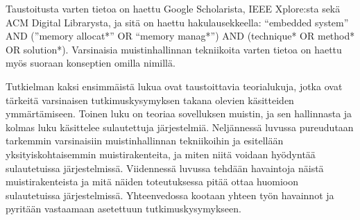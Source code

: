 Taustoitusta varten tietoa on haettu Google Scholarista, IEEE Xplore:sta sekä ACM Digital Librarysta, ja sitä on haettu hakulausekkeella: “embedded system” AND (”memory allocat*” OR “memory manag*”) AND (technique* OR method* OR solution*). Varsinaisia muistinhallinnan tekniikoita varten tietoa on haettu myös suoraan konseptien omilla nimillä.

Tutkielman kaksi ensimmäistä lukua ovat taustoittavia teorialukuja, jotka ovat tärkeitä varsinaisen tutkimuskysymyksen takana olevien käsitteiden ymmärtämiseen. Toinen luku on teoriaa sovelluksen muistin, ja sen hallinnasta ja kolmas luku käsittelee sulautettuja järjestelmiä. Neljännessä luvussa pureudutaan tarkemmin varsinaisiin muistinhallinnan tekniikoihin ja esitellään yksityiskohtaisemmin muistirakenteita, ja miten niitä voidaan hyödyntää sulautetuissa järjestelmissä. Viidennessä luvussa tehdään havaintoja näistä muistirakenteista ja mitä näiden toteutuksessa pitää ottaa huomioon sulautetuissa järjestelmissä. Yhteenvedossa kootaan yhteen työn havainnot ja pyritään vastaamaan asetettuun tutkimuskysymykseen.